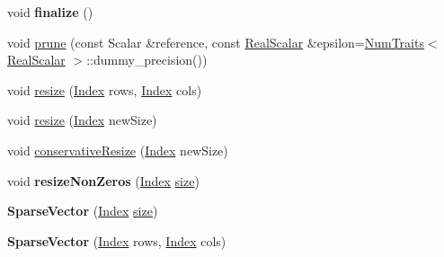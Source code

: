 \begin{DoxyCompactItemize}
\item 
\mbox{\label{class_eigen_1_1_sparse_vector_a89928f696fcaa8e59b08951b0cd3139c}} 
void {\bfseries finalize} ()
\item 
void \mbox{\hyperlink{class_eigen_1_1_sparse_vector_af094e30271da69f865b5d97f338f81d1}{prune}} (const Scalar \&reference, const \mbox{\hyperlink{class_eigen_1_1_sparse_matrix_base_aaec8ace6efb785c81d442931c3248d88}{Real\+Scalar}} \&epsilon=\mbox{\hyperlink{struct_eigen_1_1_num_traits}{Num\+Traits}}$<$ \mbox{\hyperlink{class_eigen_1_1_sparse_matrix_base_aaec8ace6efb785c81d442931c3248d88}{Real\+Scalar}} $>$\+::dummy\+\_\+precision())
\item 
void \mbox{\hyperlink{class_eigen_1_1_sparse_vector_a2dc842b3bb2ba3692e210565c48aff3c}{resize}} (\mbox{\hyperlink{struct_eigen_1_1_eigen_base_a554f30542cc2316add4b1ea0a492ff02}{Index}} rows, \mbox{\hyperlink{struct_eigen_1_1_eigen_base_a554f30542cc2316add4b1ea0a492ff02}{Index}} cols)
\item 
void \mbox{\hyperlink{class_eigen_1_1_sparse_vector_a1020011c75fb70b21257c8d04ee07514}{resize}} (\mbox{\hyperlink{struct_eigen_1_1_eigen_base_a554f30542cc2316add4b1ea0a492ff02}{Index}} new\+Size)
\item 
void \mbox{\hyperlink{class_eigen_1_1_sparse_vector_ab8dbb1f73b6250c10c0860eb13ca5cca}{conservative\+Resize}} (\mbox{\hyperlink{struct_eigen_1_1_eigen_base_a554f30542cc2316add4b1ea0a492ff02}{Index}} new\+Size)
\item 
\mbox{\label{class_eigen_1_1_sparse_vector_ab944274d5e22a048228c4f44bd1ec148}} 
void {\bfseries resize\+Non\+Zeros} (\mbox{\hyperlink{struct_eigen_1_1_eigen_base_a554f30542cc2316add4b1ea0a492ff02}{Index}} \mbox{\hyperlink{class_eigen_1_1_sparse_matrix_base_a124bc57921775eb9aa2dfd9727e23472}{size}})
\item 
\mbox{\label{class_eigen_1_1_sparse_vector_a057f549ff5d7dd2e169ceceddda993c8}} 
{\bfseries Sparse\+Vector} (\mbox{\hyperlink{struct_eigen_1_1_eigen_base_a554f30542cc2316add4b1ea0a492ff02}{Index}} \mbox{\hyperlink{class_eigen_1_1_sparse_matrix_base_a124bc57921775eb9aa2dfd9727e23472}{size}})
\item 
\mbox{\label{class_eigen_1_1_sparse_vector_ab38264aa528a0d6ae3198cbe2bee8cba}} 
{\bfseries Sparse\+Vector} (\mbox{\hyperlink{struct_eigen_1_1_eigen_base_a554f30542cc2316add4b1ea0a492ff02}{Index}} rows, \mbox{\hyperlink{struct_eigen_1_1_eigen_base_a554f30542cc2316add4b1ea0a492ff02}{Index}} cols)

\end{DoxyCompactItemize}
